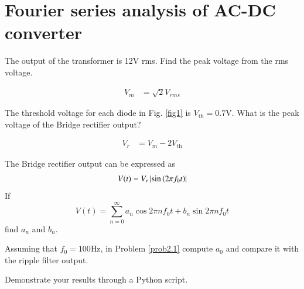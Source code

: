 \documentclass[journal,12pt,twocolumn]{IEEEtran}
\begin{document}
\section{Fourier series analysis of AC-DC converter}
\begin{problem}
The output of the transformer is 12V rms. Find the peak voltage from the rms voltage.
\end{problem}
\solution
\begin{align*}
V_{m} &= \sqrt{2}V_{rms} 
\end{align*}
\begin{problem}
The threshold voltage for each diode in Fig. \ref{fig1} is $V_{\text{th}} = 0.7$V. What is the peak voltage of the Bridge rectifier output?
\end{problem}
\solution
\begin{align*}
V_{r} &= V_{m} - 2 V_{\text{th}}
\end{align*}
\begin{problem}
\label{prob2.1}
The Bridge rectifier output can be expressed as
\begin{equation}
V(t) = V_r \left\vert\sin\left(2\pi f_0 t\right)\right\vert
\end{equation}
If
%
\begin{equation}
V(t) = \sum_{n=0}^{\infty}a_n\cos 2\pi n f_0 t + b_n \sin 2 \pi n f_0 t
\end{equation}
find $a_n$ and $b_n$.
\end{problem}
\begin{problem}
Assuming that $f_0 = 100$Hz, in Problem  \ref{prob2.1} compute $a_0$ and compare it with the ripple filter output. 
\end{problem}
\begin{problem}
Demonstrate your results through a Python script.
\end{problem}
\end{document}
